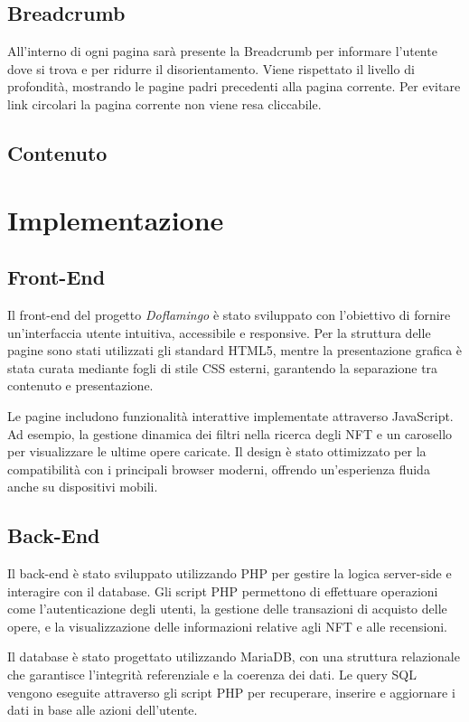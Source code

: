 \documentclass[10pt]{article}
\begin{document}
\subsection{Breadcrumb}
All'interno di ogni pagina sarà presente la Breadcrumb per informare l'utente dove si trova e per ridurre il disorientamento. Viene rispettato il livello di profondità, mostrando le pagine padri precedenti alla pagina corrente. Per evitare link circolari la pagina corrente non viene resa cliccabile.

\subsection{Contenuto}

\section{Implementazione}
\subsection{Front-End}
Il front-end del progetto \textit{Doflamingo} \`e stato sviluppato con l'obiettivo di fornire un'interfaccia utente intuitiva, accessibile e responsive. Per la struttura delle pagine sono stati utilizzati gli standard HTML5, mentre la presentazione grafica \`e stata curata mediante fogli di stile CSS esterni, garantendo la separazione tra contenuto e presentazione.

Le pagine includono funzionalit\`a interattive implementate attraverso JavaScript. Ad esempio, la gestione dinamica dei filtri nella ricerca degli NFT e un carosello per visualizzare le ultime opere caricate. Il design \`e stato ottimizzato per la compatibilit\`a con i principali browser moderni, offrendo un'esperienza fluida anche su dispositivi mobili.

\subsection{Back-End}
Il back-end \`e stato sviluppato utilizzando PHP per gestire la logica server-side e interagire con il database. Gli script PHP permettono di effettuare operazioni come l'autenticazione degli utenti, la gestione delle transazioni di acquisto delle opere, e la visualizzazione delle informazioni relative agli NFT e alle recensioni.

Il database \`e stato progettato utilizzando MariaDB, con una struttura relazionale che garantisce l'integrit\`a referenziale e la coerenza dei dati. Le query SQL vengono eseguite attraverso gli script PHP per recuperare, inserire e aggiornare i dati in base alle azioni dell'utente.
\end{document}
